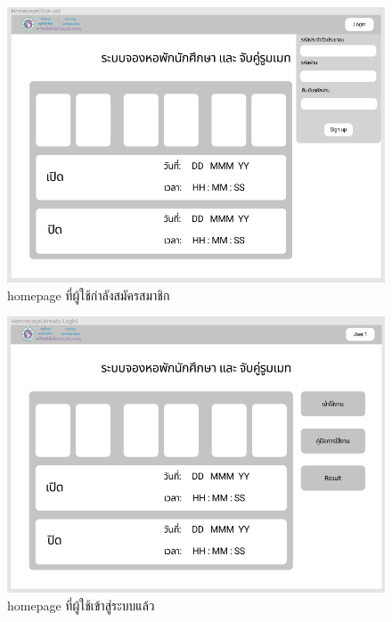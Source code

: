 \begin{enumerate}
  \begin{figure}[h]
  \begin{center}
  \includegraphics[width=\linewidth]{photo/homepageReg.png}
  \end{center}
  \caption{homepage ที่ผู้ใช้กำลังสมัครสมาชิก}
  \label{fig:hp-reg}
  \end{figure}

  \begin{figure}[h]
  \begin{center}
  \includegraphics[width=\linewidth]{photo/homepageAuth.png}
  \end{center}
  \caption{homepage ที่ผู้ใช้เข้าสู่ระบบแล้ว}
  \label{fig:hp-auth}
  \end{figure}


\end{enumerate}
